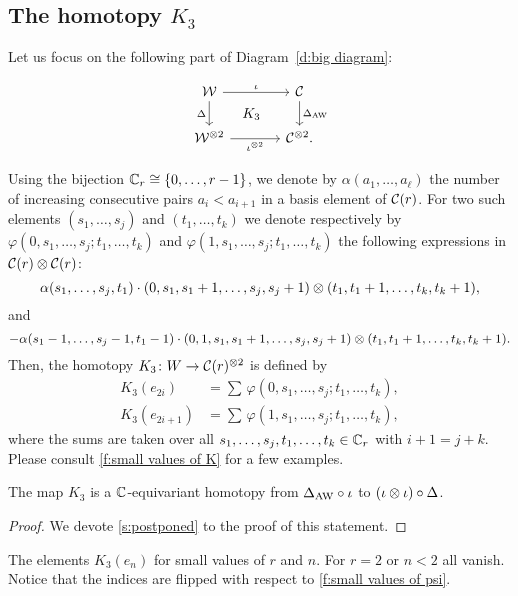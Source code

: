 \subsection{The homotopy $K_3$}\label{ss:coproduct}

Let us focus on the following part of Diagram~\eqref{d:big diagram}:

\begin{equation}\label{d:coproducts}
	\begin{tikzcd}[column sep=large]
			\cW \arrow[r,"\iota"] \arrow[d,"\Delta"'] \arrow[dr,phantom,"K_3"]&
			\cC \arrow[d,"\Delta_{\AW}"] \\
			\cW^{\ot 2} \arrow[r,"\iota^{\ot 2}"'] &
			\cC^{\ot 2}.
		\end{tikzcd}
\end{equation}

Using the bijection $\mathbb{C}_r \cong \{0,\dots,r-1\}$, we denote by $\alpha(a_1,\dots,a_\ell)$ the number of increasing consecutive pairs $a_i < a_{i+1}$ in a basis element of $\mathcal{C}(r)$.
For two such elements $(s_1,\dots,s_j)$ and $(t_1,\dots,t_k)$ we denote respectively by $\varphi(0,s_1,\dots,s_j;t_1,\dots,t_k)$ and $\varphi(1,s_1,\dots,s_j;t_1,\dots,t_k)$ the following expressions in $\mathcal{C}(r) \otimes \mathcal{C}(r)$:
\[
\alpha(s_1,\dots,s_j,t_1) \cdot
(0,s_1,s_1+1,\dots,s_j,s_j+1) \otimes
(t_1,t_1+1,\dots,t_k,t_k+1),
\]
and
\[
- \alpha(s_1-1,\dots,s_j-1,t_1-1) \cdot
(0,1,s_1,s_1+1,\dots,s_j,s_j+1)\otimes (t_1,t_1+1,\dots,t_k,t_k+1).
\]
Then, the homotopy $K_3 \colon W \to \mathcal{C}(r)^{\otimes 2}$ is defined by
\[
\begin{split}
	K_3(e_{2i}) &= \sum \, \varphi(0,s_1,\dots,s_j;t_1,\dots,t_k), \\
	K_3(e_{2i+1}) &= \sum \, \varphi(1,s_1,\dots,s_j;t_1,\dots,t_k),
\end{split}
\]
where the sums are taken over all $s_1,\dots,s_j,t_1,\dots,t_k \in \mathbb{C}_r$ with $i+1 = j+k$.
Please consult \cref{f:small values of K} for a few examples.

\begin{lemma}\label{l:K3}
	The map $K_3$ is a $\mathbb{C}$-equivariant homotopy from $\Delta_{\operatorname{AW}} \mathbin{\circ} \iota$ to $(\iota \otimes \iota) \mathbin{\circ} \Delta$.
\end{lemma}

\begin{proof}
	We devote \cref{s:postponed} to the proof of this statement.
\end{proof}

\begin{table}
	\centering
	
	\caption{The elements $K_3(e_n)$ for small values of $r$ and $n$. For $r=2$ or $n<2$ all vanish. Notice that the indices are flipped with respect to \cref{f:small values of psi}.}
	\label{f:small values of K}
\end{table}

